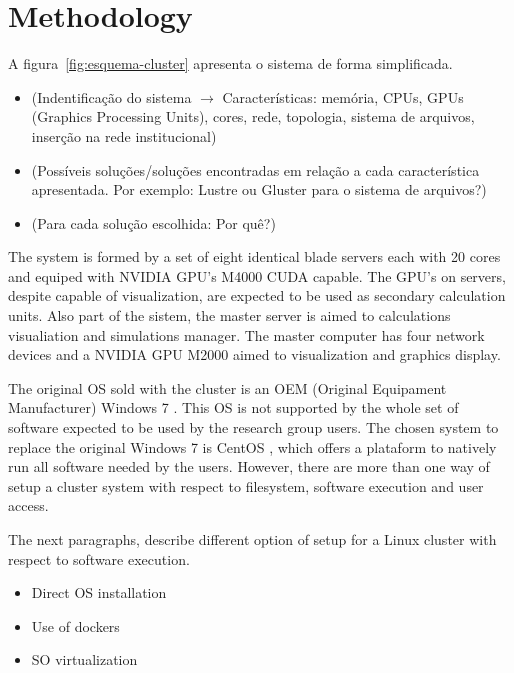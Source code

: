 \documentclass{anstrans}
\begin{document}
\section{Methodology}

  A figura~\ref{fig:esquema-cluster} apresenta o sistema de forma simplificada.
  
\begin{itemize}

\item (Indentificação do sistema $\rightarrow$ Características: memória, CPUs, GPUs (Graphics Processing Units), cores, rede, topologia, sistema de arquivos, inserção na rede institucional)

\item (Possíveis soluções/soluções encontradas em relação a cada característica apresentada. Por exemplo: Lustre \cite{Lustre} ou Gluster\cite{Gluster} para o sistema de arquivos?)

\item (Para cada solução escolhida: Por quê?)
  
\end{itemize}

The system is formed by a set of eight identical blade servers each with 20 cores and equiped with
NVIDIA GPU's M4000 CUDA\cite{CUDA} capable. The GPU's on servers, despite capable of visualization,
are expected to be used as secondary calculation units. Also part of the sistem, the master server is aimed to calculations
visualiation and simulations manager. The master computer has
four network devices and a NVIDIA GPU M2000 aimed to visualization and graphics display.

The original OS sold with the cluster is an OEM (Original Equipament Manufacturer) Windows 7 \cite{windows7}. This
OS is not supported by the whole set of software expected to be used by the research group users. The chosen
system to replace the original Windows 7 is CentOS \cite{centos}, which offers a plataform to natively run all
software needed by the users. However, there are more than one way of setup a cluster system with respect
to filesystem, software execution and user access.

The next paragraphs, describe different option of setup for a Linux cluster with respect to software execution.

\begin{itemize}
\item Direct OS installation
\item Use of dockers
\item SO virtualization
\end{itemize}
\end{document}
